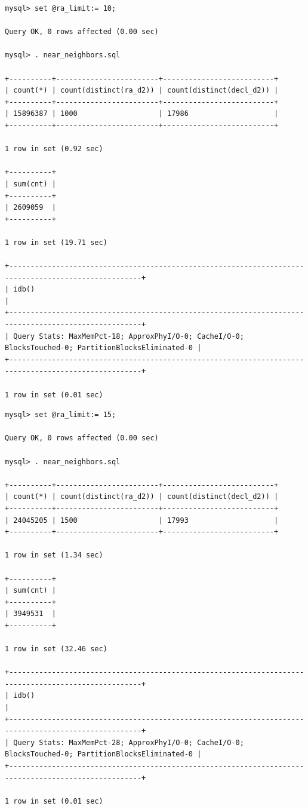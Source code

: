 \documentclass[DM,lsstdraft,toc]{lsstdoc}
\begin{document}
\begin{verbatim}
mysql> set @ra_limit:= 10;

Query OK, 0 rows affected (0.00 sec)

mysql> . near_neighbors.sql

+----------+------------------------+--------------------------+
| count(*) | count(distinct(ra_d2)) | count(distinct(decl_d2)) |
+----------+------------------------+--------------------------+
| 15896387 | 1000                   | 17986                    |
+----------+------------------------+--------------------------+

1 row in set (0.92 sec)

+----------+
| sum(cnt) |
+----------+
| 2609059  |
+----------+

1 row in set (19.71 sec)

+-----------------------------------------------------------------------------------------------------+
| idb()                                                                                               |
+-----------------------------------------------------------------------------------------------------+
| Query Stats: MaxMemPct-18; ApproxPhyI/O-0; CacheI/O-0; BlocksTouched-0; PartitionBlocksEliminated-0 |
+-----------------------------------------------------------------------------------------------------+

1 row in set (0.01 sec)
\end{verbatim}

\begin{verbatim}
mysql> set @ra_limit:= 15;

Query OK, 0 rows affected (0.00 sec)

mysql> . near_neighbors.sql

+----------+------------------------+--------------------------+
| count(*) | count(distinct(ra_d2)) | count(distinct(decl_d2)) |
+----------+------------------------+--------------------------+
| 24045205 | 1500                   | 17993                    |
+----------+------------------------+--------------------------+

1 row in set (1.34 sec)

+----------+
| sum(cnt) |
+----------+
| 3949531  |
+----------+

1 row in set (32.46 sec)

+-----------------------------------------------------------------------------------------------------+
| idb()                                                                                               |
+-----------------------------------------------------------------------------------------------------+
| Query Stats: MaxMemPct-28; ApproxPhyI/O-0; CacheI/O-0; BlocksTouched-0; PartitionBlocksEliminated-0 |
+-----------------------------------------------------------------------------------------------------+

1 row in set (0.01 sec)
\end{verbatim}
\end{document}
